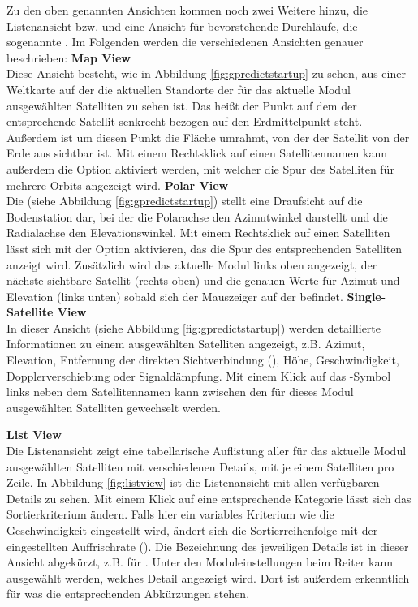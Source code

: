 Zu den oben genannten Ansichten kommen noch zwei Weitere hinzu, die Listenansicht bzw.  und eine Ansicht für bevorstehende Durchläufe, die sogenannte . Im Folgenden werden die verschiedenen Ansichten genauer beschrieben:\newpar
\textbf{Map View}\\
Diese Ansicht besteht, wie in Abbildung \ref{fig:gpredictstartup} zu sehen, aus einer Weltkarte auf der die aktuellen Standorte der für das aktuelle Modul ausgewählten Satelliten zu sehen ist. Das heißt der Punkt auf dem der entsprechende Satellit senkrecht bezogen auf den Erdmittelpunkt steht. Außerdem ist um diesen Punkt die Fläche umrahmt, von der der Satellit von der Erde aus sichtbar ist. Mit einem Rechtsklick auf einen Satellitennamen kann außerdem die Option  aktiviert werden, mit welcher die Spur des Satelliten für mehrere Orbits angezeigt wird.\newpar
\textbf{Polar View}\\
Die  (siehe Abbildung \ref{fig:gpredictstartup}) stellt eine Draufsicht auf die Bodenstation dar, bei der die Polarachse den Azimutwinkel darstellt und die Radialachse den Elevationswinkel. Mit einem Rechtsklick auf einen Satelliten lässt sich mit der Option  aktivieren, das die Spur des entsprechenden Satelliten anzeigt wird. Zusätzlich wird das aktuelle Modul links oben angezeigt, der nächste sichtbare Satellit (rechts oben) und die genauen Werte für Azimut und Elevation (links unten) sobald sich der Mauszeiger auf der  befindet.\newpar
\textbf{Single-Satellite View}\\
In dieser Ansicht (siehe Abbildung \ref{fig:gpredictstartup}) werden detaillierte Informationen zu einem ausgewählten Satelliten angezeigt, z.B. Azimut, Elevation, Entfernung der direkten Sichtverbindung (), Höhe, Geschwindigkeit, Dopplerverschiebung oder Signaldämpfung. Mit einem Klick auf das \myvsymbol-Symbol links neben dem Satellitennamen kann zwischen den für dieses Modul ausgewählten Satelliten gewechselt werden.

\clearpage

\textbf{List View}\\
Die Listenansicht zeigt eine tabellarische Auflistung aller für das aktuelle Modul ausgewählten Satelliten mit verschiedenen Details, mit je einem Satelliten pro Zeile. In Abbildung \ref{fig:listview} ist die Listenansicht mit allen verfügbaren Details zu sehen. Mit einem Klick auf eine entsprechende Kategorie lässt sich das Sortierkriterium ändern. Falls hier ein variables Kriterium wie die Geschwindigkeit eingestellt wird, ändert sich die Sortierreihenfolge mit der eingestellten Auffrischrate (). Die Bezeichnung des jeweiligen Details ist in dieser Ansicht abgekürzt, z.B.  für . Unter den Moduleinstellungen beim Reiter  kann ausgewählt werden, welches Detail angezeigt wird. Dort ist außerdem erkenntlich für was die entsprechenden Abkürzungen stehen.

